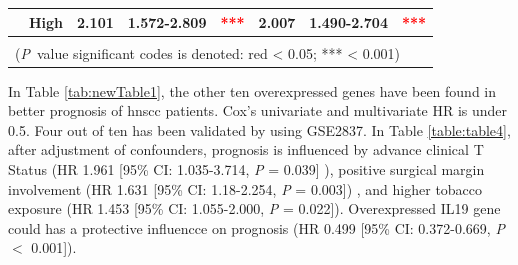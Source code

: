 \documentclass[jpm,article,submit,moreauthors,pdftex]{Definitions/mdpi}
\begin{document}
\begin{table}[hp]
{\begin{tabular}{|l|l|l|l|l|l|l|l|}
\cline{2-8}
                                        & High                                                                                & 2.101                                                                          & 1.572-2.809                                                                   & \multicolumn{1}{c|}{\textcolor{red}{***}}                                     & 2.007                                                                          & 1.490-2.704                                                                   & \multicolumn{1}{c|}{\textcolor{red}{***}}                                      \\ 
\hline
\multicolumn{8}{|l|}{}                                                                                                                                                                                                                                                                                                                                                                                                                                                                                                                                                                                                           \\ 
\hline
\multicolumn{8}{|l|}{(\textit{P}~value significant codes is denoted: red \textless{} 0.05; *** \textless{} 0.001)}                                                                                                                                                                                                                                                                                                                                                                                                                                                                                                               \\
\hline
\end{tabular}
} %
{}
\label{table:table2}
\end{table}




In Table \ref{tab:newTable1}, %
the other ten overexpressed genes have been found in better prognosis of \acrshort{hnscc} patients. Cox's univariate and multivariate HR is under 0.5.
Four out of ten has been validated by using GSE2837.
In Table \ref{table:table4},
after adjustment of confounders, prognosis is influenced by advance clinical T Status (HR 1.961 [95\% CI: 1.035-3.714, \textit{P} = 0.039] ), positive surgical margin involvement (HR 1.631 [95\% CI: 1.18-2.254, \textit{P} = 0.003]) , and higher tobacco exposure (HR 1.453 [95\% CI: 1.055-2.000, \textit{P} = 0.022]).
Overexpressed \acrshort{IL19} gene could has a protective influencce on prognosis (HR 0.499 [95\% CI: 0.372-0.669, \textit{P} $<$ 0.001]).
\end{document}
